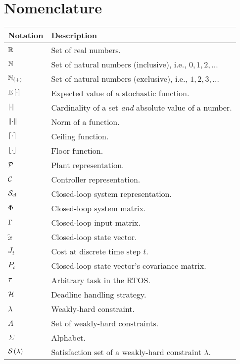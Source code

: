\chapter*{Nomenclature}%
%
\vspace{-1.75cm}

\begin{table*}[h]
    \centering
    \begin{tabular}{l|l}%
        \textbf{Notation} & \textbf{Description} \\\hline
        $\mathbb{R}$ & Set of real numbers. \\
        $\mathbb{N}_{}$ & Set of natural numbers (inclusive), i.e., $0, 1, 2, \ldots$ \\
        $\mathbb{N}_{\left( + \right)}$ & Set of natural numbers (exclusive), i.e., $1, 2, 3, \ldots$ \\
        $\mathbb{E}\left[ \cdot \right]$ & Expected value of a stochastic function. \\
        $\left|\cdot\right|$ & Cardinality of a set \emph{and} absolute value of a number. \\
        $\lVert\cdot\rVert$ & Norm of a function. \\
        $\lceil\cdot\rceil$ & Ceiling function. \\
        $\lfloor\cdot\rfloor$ & Floor function. \\
        $\mathcal{P}$ & Plant representation. \\
        $\mathcal{C}$ & Controller representation. \\
        $\mathcal{S}_{\text{cl}}$ & Closed-loop system representation. \\
        $\Phi$ & Closed-loop system matrix. \\
        $\Gamma$ & Closed-loop input matrix. \\
        $\tilde x$ & Closed-loop state vector. \\
        $J_t$ & Cost at discrete time step $t$. \\
        $P_t$ & Closed-loop state vector's covariance matrix. \\
        $\tau$ & Arbitrary task in the RTOS. \\
        $\mathcal{H}$ & Deadline handling strategy. \\
        $\lambda$ & Weakly-hard constraint. \\
        $\Lambda$ & Set of weakly-hard constraints. \\
        $\Sigma$ & Alphabet. \\
        $\mathcal{S}_{}\left( \lambda \right)$ & Satisfaction set of a weakly-hard constraint $\lambda$. \\

\end{tabular}
\end{table*}
